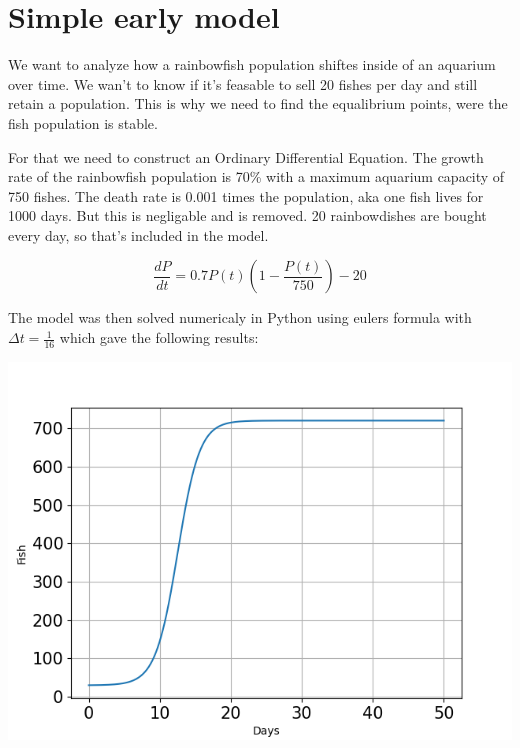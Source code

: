 \section{Simple early model}

\begin{flushleft}
    We want to analyze how a rainbowfish population shiftes inside
    of an aquarium over time. We wan't to know if it's feasable to
    sell 20 fishes per day and still retain a population. This is why
    we need to find the equalibrium points, were the fish population is
    stable.
\end{flushleft}


\begin{flushleft}
    For that we need to construct an Ordinary Differential Equation.
    The growth rate of the rainbowfish population is 70\% with
    a maximum aquarium capacity of 750 fishes. The death rate
    is 0.001 times the population, aka one fish lives for 1000
    days. But this is negligable and is removed. 20 rainbowdishes are
    bought every day, so that's included in the model.
\end{flushleft}

\begin{equation}
    \frac{dP}{dt} = 0.7P(t)(1-\frac{P(t)}{750})-20
\end{equation}

\begin{flushleft}

    The model was then solved numericaly in Python using
    eulers formula with $\Delta t=\frac{1}{16}$
    which gave the following results:

\end{flushleft}

\begin{center}
    \includegraphics[scale=0.4]{../figures/Figure_1.png}
\end{center}


